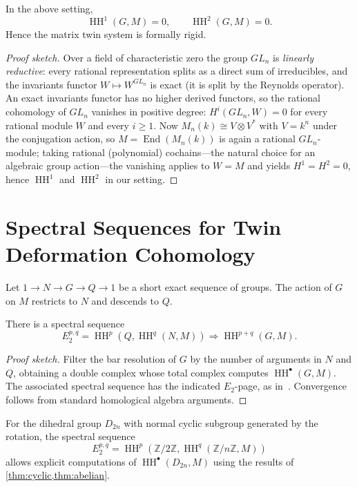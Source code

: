 \documentclass[11pt,a4paper]{article}
\numberwithin{equation}{section}
\newcommand{\Z}{\mathbb{Z}}
\DeclareMathOperator{\End}{End}
\DeclareMathOperator{\HH}{HH}
\begin{document}
	\begin{theorem}\label{thm:matrix-rigid}
		In the above setting,
		\[
		\HH^1(G,M) = 0, \qquad \HH^2(G,M) = 0.
		\]
		Hence the matrix twin system is formally rigid.
	\end{theorem}
	
	\begin{proof}[Proof sketch]
		Over a field of characteristic zero the group $GL_n$ is \emph{linearly reductive}: every rational
		representation splits as a direct sum of irreducibles, and the invariants functor $W\mapsto W^{GL_n}$
		is exact (it is split by the Reynolds operator). An exact invariants functor has no higher derived
		functors, so the rational cohomology of $GL_n$ vanishes in positive degree:
		$H^i(GL_n,W)=0$ for every rational module $W$ and every $i\ge 1$. Now $M_n(k)\cong V\otimes V^\ast$
		with $V=k^n$ under the conjugation action, so $M=\End(M_n(k))$ is again a rational $GL_n$-module;
		taking rational (polynomial) cochains---the natural choice for an algebraic group action---the
		vanishing applies to $W=M$ and yields $H^1=H^2=0$, hence
		$\HH^1$ and $\HH^2$ in our setting.
	\end{proof}
	
	\section{Spectral Sequences for Twin Deformation Cohomology}
	\label{sec:spectral}
	
	Let $1\to N\to G\to Q\to 1$ be a short exact sequence of groups.
	The action of $G$ on $M$ restricts to $N$ and descends to $Q$.
	
	\begin{theorem}\label{thm:HS}
		There is a spectral sequence
		\[
		E_2^{p,q} = \HH^p(Q,\HH^q(N,M)) \Longrightarrow \HH^{p+q}(G,M).
		\]
	\end{theorem}
	
	\begin{proof}[Proof sketch]
		Filter the bar resolution of $G$ by the number of arguments in $N$ and $Q$, obtaining
		a double complex whose total complex computes $\HH^\bullet(G,M)$. The associated spectral
		sequence has the indicated $E_2$-page, as in~\cite{HochschildSerre1953}.
		Convergence follows from standard homological algebra arguments.
	\end{proof}
	
	\begin{example}
		For the dihedral group $D_{2n}$ with normal cyclic subgroup generated by the rotation,
		the spectral sequence
		\[
		E_2^{p,q} = \HH^p(\Z/2\Z, \HH^q(\Z/n\Z,M))
		\]
		allows explicit computations of $\HH^\bullet(D_{2n},M)$ using the results of
		\cref{thm:cyclic,thm:abelian}.
	\end{example}
	
\end{document}
